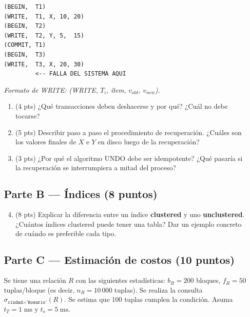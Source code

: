 \documentclass[11pt,a4paper]{article}
\begin{document}
\begin{lstlisting}[style=log]
(BEGIN,  T1)
(WRITE,  T1, X, 10, 20)
(BEGIN,  T2)
(WRITE,  T2, Y, 5,  15)
(COMMIT, T1)
(BEGIN,  T3)
(WRITE,  T3, X, 20, 30)
         <-- FALLA DEL SISTEMA AQUI
\end{lstlisting}

\noindent\small\textit{Formato de WRITE: (WRITE, $T_i$, ítem, $v_{old}$, $v_{new}$).}

\normalsize
\begin{enumerate}
  \item (4 pts) ¿Qué transacciones deben deshacerse y por qué? ¿Cuál no debe tocarse?

  \vspace{2.5cm}

  \item (5 pts) Describir paso a paso el procedimiento de recuperación. ¿Cuáles son los valores finales de $X$ e $Y$ en disco luego de la recuperación?

  \vspace{3cm}

  \item (3 pts) ¿Por qué el algoritmo UNDO debe ser idempotente? ¿Qué pasaría si la recuperación se interrumpiera a mitad del proceso?

  \vspace{2.5cm}
\end{enumerate}

\subsection*{Parte B — Índices (8 puntos)}

\begin{enumerate}
  \setcounter{enumi}{3}
  \item (8 pts) Explicar la diferencia entre un índice \textbf{clustered} y uno \textbf{unclustered}. ¿Cuántos índices clustered puede tener una tabla? Dar un ejemplo concreto de cuándo es preferible cada tipo.

  \vspace{4.5cm}
\end{enumerate}

\subsection*{Parte C — Estimación de costos (10 puntos)}

Se tiene una relación $R$ con las siguientes estadísticas: $b_R = 200$ bloques, $f_R = 50$ tuplas/bloque (es decir, $n_R = 10\,000$ tuplas). Se realiza la consulta $\sigma_{\texttt{ciudad} = \texttt{'Rosario'}}(R)$. Se estima que 100 tuplas cumplen la condición. Asuma $t_T = 1\;\text{ms}$ y $t_s = 5\;\text{ms}$.
\end{document}
